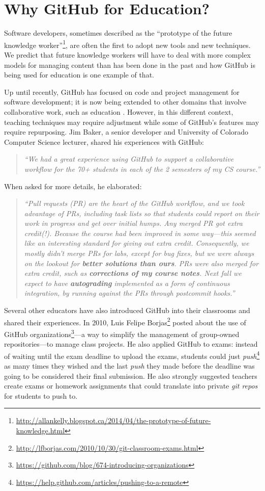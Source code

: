 \section{Why GitHub for Education?}
Software developers, sometimes described as the ``prototype of the future knowledge worker''\footnote{\url{http://allankelly.blogspot.ca/2014/04/the-prototype-of-future-knowledge.html}}, are often the first to adopt new tools and new techniques. We predict that future knowledge workers will have to deal with more complex models for managing content than has been done in the past and how GitHub is being used for education is one example of that.

Up until recently, GitHub has focused on code and project management for software development; it is now being extended to other domains that involve collaborative work, such as education \cite{Griffin:2013:GCJ:2458539.2458551}. However, in this different context, teaching techniques may require adjustment while some of GitHub's features may require repurposing. Jim Baker, a senior developer and University of Colorado Computer Science lecturer, shared his experiences with GitHub: \begin{quote}\textit{``We had a great experience using GitHub to support a collaborative workflow for the 70+ students in each of the 2 semesters of my CS course.''}\end{quote} When asked for more details, he elaborated: \begin{quote}\textit{``Pull requests (PR) are the heart of the GitHub workflow, and we took advantage of PRs, including task lists so that students could report on their work in progress and get over initial humps. Any merged PR got extra credit(!). Because the course had been improved in some way---this seemed like an interesting standard for giving out extra credit. Consequently, we mostly didn't merge PRs for labs, except for bug fixes, but we were always on the lookout for \textbf{better solutions than ours}. PRs were also merged for extra credit, such as \textbf{corrections of my course notes}. Next fall we expect to have \textbf{autograding} implemented as a form of continuous integration, by running against the PRs through postcommit hooks.''}\end{quote}

Several other educators have also introduced GitHub into their classrooms and shared their experiences. In 2010, Luis Felipe Borjas\footnote{\url{http://lfborjas.com/2010/10/30/git-classroom-exams.html}} posted about the use of GitHub organizations\footnote{\url{https://github.com/blog/674-introducing-organizations}}---a way to simplify the management of group-owned repositories---to manage class projects. He also applied GitHub to exams: instead of waiting until the exam deadline to upload the exams, students could just \textit{push}\footnote{\url{https://help.github.com/articles/pushing-to-a-remote}} as many times they wished and the last \textit{push} they made before the deadline was going to be considered their final submission. He also strongly suggested teachers create exams or homework assignments that could translate into private \textit{git repos} for students to push to.

